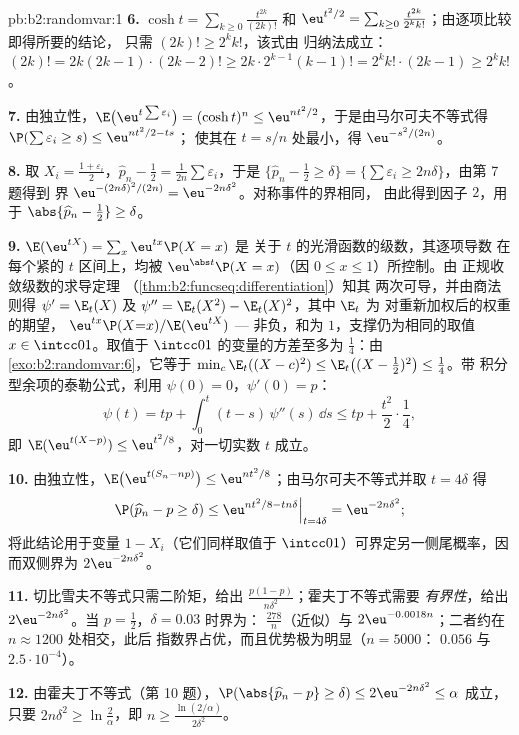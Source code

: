 \begin{solution}{pb:b2:randomvar:1}
\textbf{6.} $\cosh t = \sum_{k\geq0}\frac{t^{2k}}{(2k)!}$ 和
$\eu^{t^2/2} = \sum_{k\geq0}\frac{t^{2k}}{2^kk!}$；由逐项比较即得所要的结论，
只需 $(2k)! \geq 2^kk!$，该式由
归纳法成立：$(2k)! = 2k(2k-1)\cdot(2k-2)! \geq 2k\cdot
2^{k-1}(k-1)! = 2^kk!\cdot(2k-1) \geq 2^kk!$。

\textbf{7.} 由独立性，$\E\bigl(\eu^{t\sum\varepsilon_i}
\bigr) = (\cosh t)^n \leq \eu^{nt^2/2}$，于是由马尔可夫不等式得
$\P(\sum\varepsilon_i \geq s) \leq \eu^{nt^2/2 - ts}$；
使其在 $t = s/n$ 处最小，得 $\eu^{-s^2/(2n)}$。

\textbf{8.} 取 $X_i = \frac{1 + \varepsilon_i}2$，$\widehat
p_n - \frac12 = \frac1{2n}\sum\varepsilon_i$，于是
$\{\widehat p_n - \frac12 \geq \delta\} =
\{\sum\varepsilon_i \geq 2n\delta\}$，由第 7 题得到
界 $\eu^{-(2n\delta)^2/(2n)} = \eu^{-2n\delta^2}$。对称事件的界相同，
由此得到因子 $2$，用于
$\abs{\widehat p_n - \frac12} \geq \delta$。

\textbf{9.} $\E(\eu^{tX}) = \sum_x\eu^{tx}\P(X = x)$ 是
关于 $t$ 的光滑函数的级数，其逐项导数
在每个紧的 $t$ 区间上，均被
$\eu^{\abs t}\P(X = x)$（因 $0 \leq x \leq 1$）所控制。由
正规收敛级数的求导定理
（\cref{thm:b2:funcseq:differentiation}）知其
两次可导，并由商法则得 $\psi' = \E_t(X)$
及 $\psi'' = \E_t(X^2) - \E_t(X)^2$，其中 $\E_t$ 为
对重新加权后的权重的期望，
$\eu^{tx}\P(X{=}x)/\E(\eu^{tX})$ --- 非负，和为
$1$，支撑仍为相同的取值 $x \in \intcc01$。取值于
$\intcc01$ 的变量的方差至多为 $\frac14$：由
\cref{exo:b2:randomvar:6}，它等于 $\min_c\E_t((X - c)^2) \leq
\E_t\bigl((X - \tfrac12)^2\bigr) \leq \tfrac14$。带
积分型余项的泰勒公式，利用 $\psi(0) = 0$，$\psi'(0) = p$：
\[
\psi(t) = tp + \int_0^t(t - s)\,\psi''(s)\,\dd s
\leq tp + \frac{t^2}2\cdot\frac14,
\]
即 $\E(\eu^{t(X - p)}) \leq \eu^{t^2/8}$，对一切实数 $t$ 成立。

\textbf{10.} 由独立性，$\E\bigl(\eu^{t(S_n -
np)}\bigr) \leq \eu^{nt^2/8}$；由马尔可夫不等式并取 $t
= 4\delta$ 得
\[
\P(\widehat p_n - p \geq \delta)
\leq \eu^{nt^2/8 - tn\delta}\Big|_{t = 4\delta}
= \eu^{-2n\delta^2};
\]
将此结论用于变量 $1 - X_i$（它们同样取值于
$\intcc01$）可界定另一侧尾概率，因而双侧界为
$2\eu^{-2n\delta^2}$。

\textbf{11.} 切比雪夫不等式只需二阶矩，给出
$\frac{p(1-p)}{n\delta^2}$；霍夫丁不等式需要
\emph{有界性}，给出 $2\eu^{-2n\delta^2}$。当 $p =
\frac12$，$\delta = 0.03$ 时界为：
$\frac{278}{n}$（近似）与
$2\eu^{-0.0018n}$；二者约在 $n \approx 1200$ 处相交，此后
指数界占优，而且优势极为明显（$n = 5000$：
$0.056$ 与 $2.5\cdot10^{-4}$）。

\textbf{12.} 由霍夫丁不等式（第 10 题），$\P(\abs{\widehat
p_n - p} \geq \delta) \leq 2\eu^{-2n\delta^2} \leq \alpha$ 成立，
只要 $2n\delta^2 \geq \ln\frac2\alpha$，即 $n \geq
\frac{\ln(2/\alpha)}{2\delta^2}$。


\end{solution}
